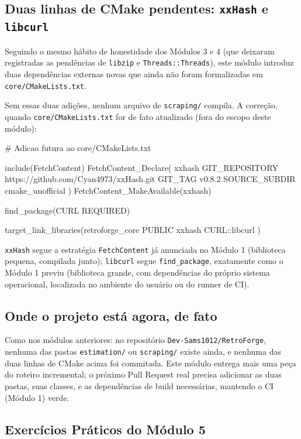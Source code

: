 \subsection{Duas linhas de CMake pendentes: \texttt{xxHash} e \texttt{libcurl}}

Seguindo o mesmo hábito de honestidade dos Módulos 3 e 4 (que deixaram registradas as pendências de \texttt{libzip} e \texttt{Threads::Threads}), este módulo introduz duas dependências externas novas que ainda não foram formalizadas em \texttt{core/CMakeLists.txt}.

\begin{CaixaAlerta}
Sem essas duas adições, nenhum arquivo de \texttt{scraping/} compila. A correção, quando \texttt{core/CMakeLists.txt} for de fato atualizado (fora do escopo deste módulo):
\begin{CaixaCodigo}
# Adicao futura ao core/CMakeLists.txt

include(FetchContent)
FetchContent_Declare(
    xxhash
    GIT_REPOSITORY https://github.com/Cyan4973/xxHash.git
    GIT_TAG v0.8.2
    SOURCE_SUBDIR cmake_unofficial
)
FetchContent_MakeAvailable(xxhash)

find_package(CURL REQUIRED)

target_link_libraries(retroforge_core PUBLIC
    xxhash
    CURL::libcurl
)
\end{CaixaCodigo}
\texttt{xxHash} segue a estratégia \texttt{FetchContent} já anunciada no Módulo 1 (biblioteca pequena, compilada junto); \texttt{libcurl} segue \texttt{find\_package}, exatamente como o Módulo 1 previu (biblioteca grande, com dependências do próprio sistema operacional, localizada no ambiente do usuário ou do runner de CI).
\end{CaixaAlerta}

\subsection{Onde o projeto está agora, de fato}

Como nos módulos anteriores: no repositório \texttt{Dev-Sams1012/RetroForge}, nenhuma das pastas \texttt{estimation/} ou \texttt{scraping/} existe ainda, e nenhuma das duas linhas de CMake acima foi commitada. Este módulo entrega mais uma peça do roteiro incremental; o próximo Pull Request real precisa adicionar as duas pastas, suas classes, e as dependências de build necessárias, mantendo o CI (Módulo 1) verde.

\subsection{Exercícios Práticos do Módulo 5}

